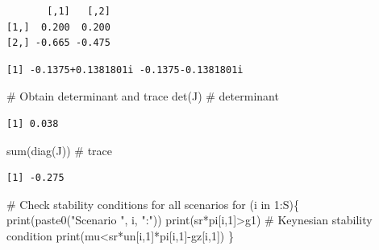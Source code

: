 \documentclass[
  letterpaper,
  DIV=11,
  numbers=noendperiod]{scrreprt}
\newenvironment{Shaded}{\begin{snugshade}}{\end{snugshade}}
\newcommand{\CommentTok}[1]{\textcolor[rgb]{0.37,0.37,0.37}{#1}}
\newcommand{\ControlFlowTok}[1]{\textcolor[rgb]{0.00,0.23,0.31}{#1}}
\newcommand{\DecValTok}[1]{\textcolor[rgb]{0.68,0.00,0.00}{#1}}
\newcommand{\FunctionTok}[1]{\textcolor[rgb]{0.28,0.35,0.67}{#1}}
\newcommand{\NormalTok}[1]{\textcolor[rgb]{0.00,0.23,0.31}{#1}}
\newcommand{\OtherTok}[1]{\textcolor[rgb]{0.00,0.23,0.31}{#1}}
\newcommand{\SpecialCharTok}[1]{\textcolor[rgb]{0.37,0.37,0.37}{#1}}
\newcommand{\StringTok}[1]{\textcolor[rgb]{0.13,0.47,0.30}{#1}}
\begin{document}
\begin{verbatim}
       [,1]   [,2]
[1,]  0.200  0.200
[2,] -0.665 -0.475
\end{verbatim}

\begin{Shaded}
\end{Shaded}

\begin{verbatim}
[1] -0.1375+0.1381801i -0.1375-0.1381801i
\end{verbatim}

\begin{Shaded}
\begin{Highlighting}[]
\CommentTok{\# Obtain determinant and trace}
\FunctionTok{det}\NormalTok{(J) }\CommentTok{\# determinant}
\end{Highlighting}
\end{Shaded}

\begin{verbatim}
[1] 0.038
\end{verbatim}

\begin{Shaded}
\begin{Highlighting}[]
\FunctionTok{sum}\NormalTok{(}\FunctionTok{diag}\NormalTok{(J)) }\CommentTok{\# trace}
\end{Highlighting}
\end{Shaded}

\begin{verbatim}
[1] -0.275
\end{verbatim}

\begin{Shaded}
\begin{Highlighting}[]
\CommentTok{\# Check stability conditions for all scenarios}
\ControlFlowTok{for}\NormalTok{ (i }\ControlFlowTok{in} \DecValTok{1}\SpecialCharTok{:}\NormalTok{S)\{}
\FunctionTok{print}\NormalTok{(}\FunctionTok{paste0}\NormalTok{(}\StringTok{"Scenario "}\NormalTok{, i, }\StringTok{":"}\NormalTok{))}
\FunctionTok{print}\NormalTok{(sr}\SpecialCharTok{*}\NormalTok{pi[i,}\DecValTok{1}\NormalTok{]}\SpecialCharTok{\textgreater{}}\NormalTok{g1) }\CommentTok{\# Keynesian stability condition}
\FunctionTok{print}\NormalTok{(mu}\SpecialCharTok{\textless{}}\NormalTok{sr}\SpecialCharTok{*}\NormalTok{un[i,}\DecValTok{1}\NormalTok{]}\SpecialCharTok{*}\NormalTok{pi[i,}\DecValTok{1}\NormalTok{]}\SpecialCharTok{{-}}\NormalTok{gz[i,}\DecValTok{1}\NormalTok{])}
\NormalTok{\}}
\end{Highlighting}
\end{Shaded}
\end{document}
